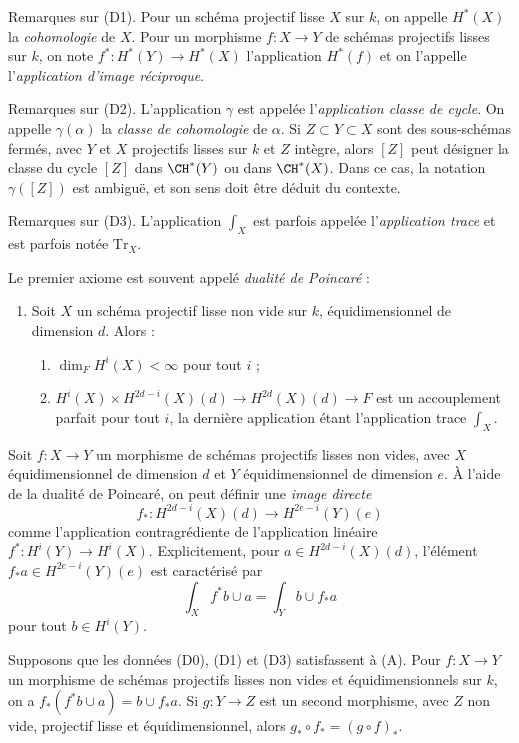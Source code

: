 \medskip\noindent
Remarques sur (D1).
Pour un schéma projectif lisse $X$ sur $k$, on appelle $H^*(X)$
la {\it cohomologie} de $X$. Pour un morphisme $f : X \to Y$
de schémas projectifs lisses sur $k$, on note $f^* : H^*(Y) \to H^*(X)$
l'application $H^*(f)$ et on l'appelle l'{\it application d'image réciproque}.

\medskip\noindent
Remarques sur (D2). L'application $\gamma$ est appelée l'{\it application classe de cycle}.
On appelle $\gamma(\alpha)$ la {\it classe de cohomologie} de $\alpha$.
Si $Z \subset Y \subset X$ sont des sous-schémas fermés, avec $Y$ et $X$
projectifs lisses sur $k$ et $Z$ intègre, alors $[Z]$ peut
désigner la classe du cycle $[Z]$ dans $\CH^*(Y)$ ou dans $\CH^*(X)$.
Dans ce cas, la notation $\gamma([Z])$ est ambiguë, et son sens
doit être déduit du contexte.

\medskip\noindent
Remarques sur (D3). L'application $\int_X$ est parfois appelée
l'{\it application trace} et est parfois notée $\text{Tr}_X$.

\medskip\noindent
Le premier axiome est souvent appelé {\it dualité de Poincar\'e} :
\begin{enumerate}
\item[(A)] Soit $X$ un schéma projectif lisse non vide sur $k$,
équidimensionnel de dimension $d$. Alors :
\begin{enumerate}
\item $\dim_F H^i(X) < \infty$ pour tout $i$ ;
\item $H^i(X) \times H^{2d - i}(X)(d) \rightarrow
H^{2d}(X)(d) \rightarrow F$
est un accouplement parfait pour tout $i$, la dernière
application étant l'application trace $\int_X$.
\end{enumerate}
\end{enumerate}
Soit $f : X \to Y$ un morphisme de schémas projectifs lisses non vides, avec $X$
équidimensionnel de dimension $d$ et $Y$ équidimensionnel de dimension $e$.
À l'aide de la dualité de Poincar\'e, on peut définir une {\it image directe}
$$
f_* : H^{2d - i}(X)(d) \longrightarrow H^{2e - i}(Y)(e)
$$
comme l'application contragrédiente de l'application linéaire $f^* : H^i(Y) \to H^i(X)$.
Explicitement, pour $a \in H^{2d - i}(X)(d)$, l'élément $f_*a \in H^{2e - i}(Y)(e)$
est caractérisé par
$$
\int_X f^*b \cup a = \int_Y b \cup f_*a
$$
pour tout $b \in H^i(Y)$.

\begin{lemma}
\label{lemma-pushforward}
Supposons que les données (D0), (D1) et (D3) satisfassent à (A). Pour $f : X \to Y$
un morphisme de schémas projectifs lisses non vides et équidimensionnels sur $k$,
on a $f_*(f^*b \cup a) = b \cup f_*a$. Si $g : Y \to Z$ est un second morphisme,
avec $Z$ non vide, projectif lisse et équidimensionnel, alors
$g_* \circ f_* = (g \circ f)_*$.
\end{lemma}


